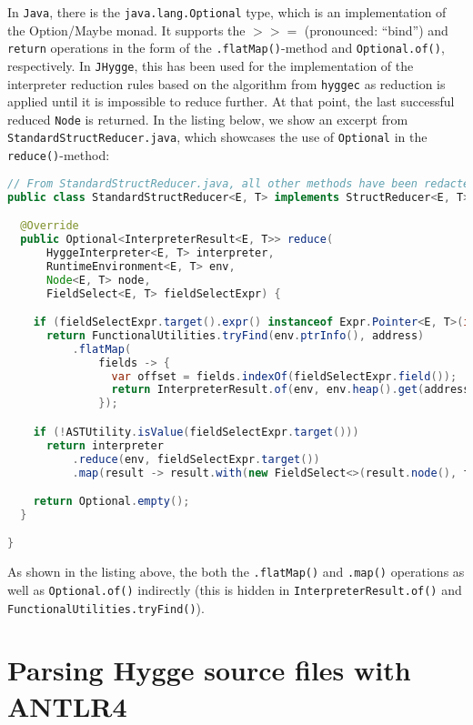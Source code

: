 In \texttt{Java}, there is the \texttt{java.lang.Optional} type, which is an implementation of the Option/Maybe monad. It
supports the $>>=$ (pronounced: ``bind'') and \texttt{return} operations in the form of the \texttt{.flatMap()}-method
and \texttt{Optional.of()}, respectively. In \texttt{JHygge}, this has been used for the implementation of the interpreter
reduction rules based on the algorithm from \texttt{hyggec} as reduction is applied until it is impossible to reduce further.
At that point, the last successful reduced \texttt{Node} is returned. In the listing below, we show an excerpt from
\texttt{StandardStructReducer.java}, which showcases the use of \texttt{Optional} in the \texttt{reduce()}-method:

\begin{lstlisting}[language=Java]
// From StandardStructReducer.java, all other methods have been redacted ...
public class StandardStructReducer<E, T> implements StructReducer<E, T> {

  @Override
  public Optional<InterpreterResult<E, T>> reduce(
      HyggeInterpreter<E, T> interpreter,
      RuntimeEnvironment<E, T> env,
      Node<E, T> node,
      FieldSelect<E, T> fieldSelectExpr) {

    if (fieldSelectExpr.target().expr() instanceof Expr.Pointer<E, T>(int address))
      return FunctionalUtilities.tryFind(env.ptrInfo(), address)
          .flatMap(
              fields -> {
                var offset = fields.indexOf(fieldSelectExpr.field());
                return InterpreterResult.of(env, env.heap().get(address + offset));
              });

    if (!ASTUtility.isValue(fieldSelectExpr.target()))
      return interpreter
          .reduce(env, fieldSelectExpr.target())
          .map(result -> result.with(new FieldSelect<>(result.node(), fieldSelectExpr.field())));

    return Optional.empty();
  }

}
\end{lstlisting}

As shown in the listing above, the both the \texttt{.flatMap()} and \texttt{.map()} operations as well as \texttt{Optional.of()}
indirectly (this is hidden in \texttt{InterpreterResult.of()} and \texttt{FunctionalUtilities.tryFind()}).

\section{Parsing Hygge source files with ANTLR4}

